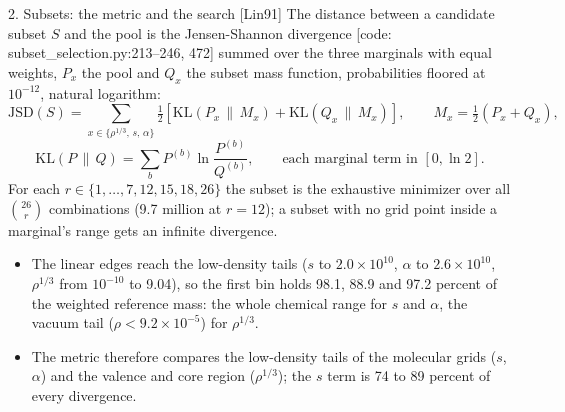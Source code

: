 \begin{frame}{2. Subsets: the metric and the search [Lin91]}
  \small
  The distance between a candidate subset $S$ and the pool is the Jensen-Shannon divergence [code: subset\_selection.py:213--246, 472] summed over the three marginals with equal weights, $P_x$ the pool and $Q_x$ the subset mass function, probabilities floored at $10^{-12}$, natural logarithm:
  \[
  \mathrm{JSD}(S) = \sum_{x \in \{\rho^{1/3},\, s,\, \alpha\}} \tfrac12 \left[ \mathrm{KL}(P_x \,\|\, M_x) + \mathrm{KL}(Q_x \,\|\, M_x) \right], \qquad
  M_x = \tfrac12 (P_x + Q_x),
  \]
  \[
  \mathrm{KL}(P \,\|\, Q) = \sum_b P^{(b)} \ln \frac{P^{(b)}}{Q^{(b)}}, \qquad \text{each marginal term in } [0, \ln 2].
  \]
  For each $r \in \{1,\ldots,7, 12, 15, 18, 26\}$ the subset is the exhaustive minimizer over all $\binom{26}{r}$ combinations (9.7 million at $r = 12$); a subset with no grid point inside a marginal's range gets an infinite divergence.
  \begin{itemize}
    \item The linear edges reach the low-density tails ($s$ to $2.0\times10^{10}$, $\alpha$ to $2.6\times10^{10}$, $\rho^{1/3}$ from $10^{-10}$ to 9.04), so the first bin holds 98.1, 88.9 and 97.2 percent of the weighted reference mass: the whole chemical range for $s$ and $\alpha$, the vacuum tail ($\rho < 9.2\times10^{-5}$) for $\rho^{1/3}$.
    \item The metric therefore compares the low-density tails of the molecular grids ($s$, $\alpha$) and the valence and core region ($\rho^{1/3}$); the $s$ term is 74 to 89 percent of every divergence.
  \end{itemize}
\end{frame}
